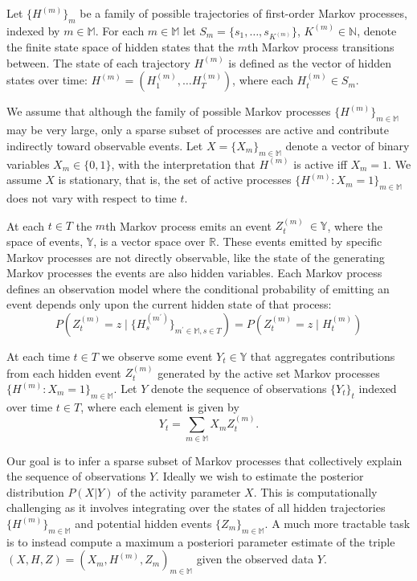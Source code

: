 \documentclass[12pt]{article}
\newcommand{\mm}[0] {\mathbb{M}} %
\newcommand{\traj}[1] {H^{(#1)}}
\newcommand{\state}[2] {H_{#2}^{(#1)}}
\newcommand{\event}[2] {Z_{#2}^{(#1)}}
\newcommand{\reals}[0] {\mathbb{R}}
\newcommand{\naturals}[0] {\mathbb{N}}
\newcommand{\events}[0] {\mathbb{Y}}
\begin{document}
Let $\{ \traj m \}_m$ be a family of possible trajectories of first-order Markov processes, indexed by $m \in \mm$. For each $m \in \mm$ let $S_m = \{s_1, \ldots, s_{K^{(m)}}\}$, $K^{(m)} \in \naturals$, denote the finite state space of hidden states that the $m$th Markov process transitions between. The state of each trajectory $\traj m$ is defined as the vector of hidden states over time: $\traj m = (\state m 1, \ldots \state m T)$, where each $\state m t \in S_m$.

We assume that although the family of possible Markov processes $\{\traj m\}_{m \in \mm}$ may be very large, only a sparse subset of processes are active and contribute indirectly toward observable events. Let $X = \{X_m\}_{m \in \mm}$ denote a vector of binary variables $X_m \in \{0, 1\}$, with the interpretation that $\traj m$ is active iff $X_m = 1$. We assume $X$ is stationary, that is, the set of active processes $\{ \traj m : X_m = 1\}_{m \in \mm}$ does not vary with respect to time $t$.

At each $t \in T$ the $m$th Markov process emits an event $\event m t \ \in \events$, where the space of events, $\events$, is a vector space over $\reals$. These events emitted by specific Markov processes are not directly observable, like the state of the generating Markov processes the events are also hidden variables. Each Markov process defines an observation model where the conditional probability of emitting an event depends only upon the current hidden state of that process:
\begin{equation}
P\left(\event m t = z \mid \{\state {m^\prime} s\}_{m^\prime \in \mm, s \in T} \right) =
P\left(\event m t = z \mid \state m t \right) \label{obsmodelindep}
\end{equation}

At each time $t \in T$ we observe some event $Y_t \in \events$ that aggregates contributions from each hidden event $\event m t$ generated by the active set Markov processes $\{ \traj m : X_m = 1\}_{m \in \mm}$. Let $Y$ denote the sequence of observations $\{Y_t\}_t$ indexed over time $t \in T$, where each element is given by
\begin{equation}
Y_t = \sum_{m \in \mm} X_m \event m t .
\end{equation}

Our goal is to infer a sparse subset of Markov processes that collectively explain the sequence of observations $Y$. Ideally we wish to estimate the posterior distribution $P(X | Y)$ of the activity parameter $X$. This is computationally challenging as it involves integrating over the states of all hidden trajectories $\{ \traj m\}_{m \in \mm}$ and potential hidden events $\{ Z_m \}_{m \in \mm}$. A much more tractable task is to instead compute a maximum a posteriori parameter estimate of the triple $(X, H, Z) = (X_m, \traj m, Z_m)_{m \in \mm}$ given the observed data $Y$.
\end{document}
